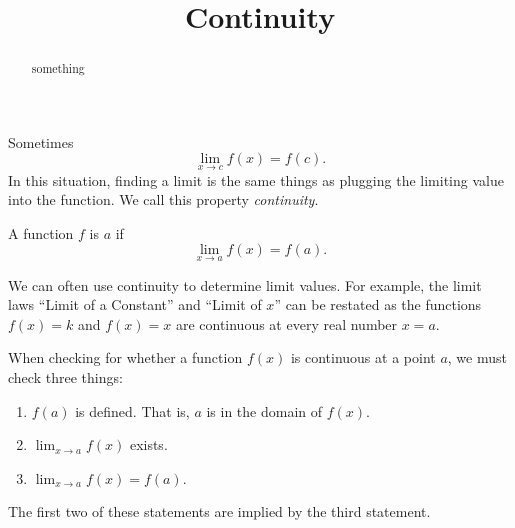 \documentclass{ximera}
\title[Dig-In:]{Continuity}
\begin{document}
\begin{abstract}
  something
\end{abstract}
\maketitle

Sometimes
\[
\lim_{x\to c}f(x) = f(c).
\]
In this situation, finding a limit is the same things as plugging the
limiting value into the function.  We call this property
\textit{continuity}.

\begin{definition}
  A function $f$ is  $a$ if
  \[
  \lim_{x\to a}f(x) = f(a).
  \]
\end{definition}


We can often use continuity to determine limit values.  For example,
the limit laws ``Limit of a Constant'' and ``Limit of $x$'' can be
restated as the functions $f(x)=k$ and $f(x)=x$ are continuous at
every real number $x=a$.

When checking for whether a function $f(x)$ is continuous at a point
$a$, we must check three things:
\begin{enumerate}
\item $f(a)$ is defined.  That is, $a$ is in the domain of $f(x)$.
\item $\lim_{x\to a}f(x)$ exists.
\item $\lim_{x\to a} f(x) = f(a)$.
\end{enumerate}

The first two of these statements are implied by the third statement.
\end{document}
